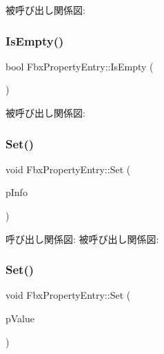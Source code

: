 被呼び出し関係図\+:
\mbox{\label{class_fbx_property_entry_a05ea4a2311ae76c4e74653dfbbca6446}} 
\subsubsection{\texorpdfstring{Is\+Empty()}{IsEmpty()}}
{\footnotesize\ttfamily bool Fbx\+Property\+Entry\+::\+Is\+Empty (\begin{DoxyParamCaption}{ }\end{DoxyParamCaption})}

被呼び出し関係図\+:
\mbox{\label{class_fbx_property_entry_ad1aae55932cd5bb6dac87c580ddf9e64}} 
\subsubsection{\texorpdfstring{Set()}{Set()}\hspace{0.1cm}{\footnotesize\ttfamily [1/5]}}
{\footnotesize\ttfamily void Fbx\+Property\+Entry\+::\+Set (\begin{DoxyParamCaption}\item[{\hyperlink{class_fbx_property_info}{Fbx\+Property\+Info} $\ast$}]{p\+Info }\end{DoxyParamCaption})}

呼び出し関係図\+:
被呼び出し関係図\+:
\mbox{\label{class_fbx_property_entry_a2b8e9b06392c64c7ad2279f0cd22b26a}} 
\subsubsection{\texorpdfstring{Set()}{Set()}\hspace{0.1cm}{\footnotesize\ttfamily [2/5]}}
{\footnotesize\ttfamily void Fbx\+Property\+Entry\+::\+Set (\begin{DoxyParamCaption}\item[{\hyperlink{class_fbx_property_value}{Fbx\+Property\+Value} $\ast$}]{p\+Value }\end{DoxyParamCaption})}

